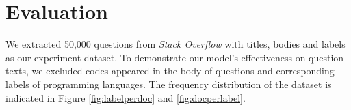 \section{Evaluation}
\label{sec:eval}

We extracted 50,000 questions from \emph{Stack Overflow} with titles, bodies and labels as our experiment dataset. To demonstrate our model's effectiveness on question texts, we excluded codes appeared in the body of questions and corresponding labels of programming languages. The frequency distribution of the dataset is indicated in Figure \ref{fig:labelperdoc} and \ref{fig:docperlabel}.



